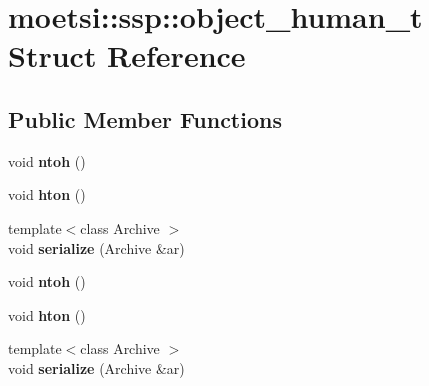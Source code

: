\hypertarget{structmoetsi_1_1ssp_1_1object__human__t}{}\section{moetsi\+:\+:ssp\+:\+:object\+\_\+human\+\_\+t Struct Reference}
\label{structmoetsi_1_1ssp_1_1object__human__t}
\subsection*{Public Member Functions}
\begin{DoxyCompactItemize}
\item 
\mbox{\label{structmoetsi_1_1ssp_1_1object__human__t_a632ac93d295ec9eb610b9823667d478d}} 
void {\bfseries ntoh} ()
\item 
\mbox{\label{structmoetsi_1_1ssp_1_1object__human__t_ae698148d40aa80fb8b977ef324617222}} 
void {\bfseries hton} ()
\item 
\mbox{\label{structmoetsi_1_1ssp_1_1object__human__t_a74cbe99bed62452a496fdd1fd5cc2bdd}} 
{\footnotesize template$<$class Archive $>$ }\\void {\bfseries serialize} (Archive \&ar)
\item 
\mbox{\label{structmoetsi_1_1ssp_1_1object__human__t_a632ac93d295ec9eb610b9823667d478d}} 
void {\bfseries ntoh} ()
\item 
\mbox{\label{structmoetsi_1_1ssp_1_1object__human__t_ae698148d40aa80fb8b977ef324617222}} 
void {\bfseries hton} ()
\item 
\mbox{\label{structmoetsi_1_1ssp_1_1object__human__t_a74cbe99bed62452a496fdd1fd5cc2bdd}} 
{\footnotesize template$<$class Archive $>$ }\\void {\bfseries serialize} (Archive \&ar)
\end{DoxyCompactItemize}
